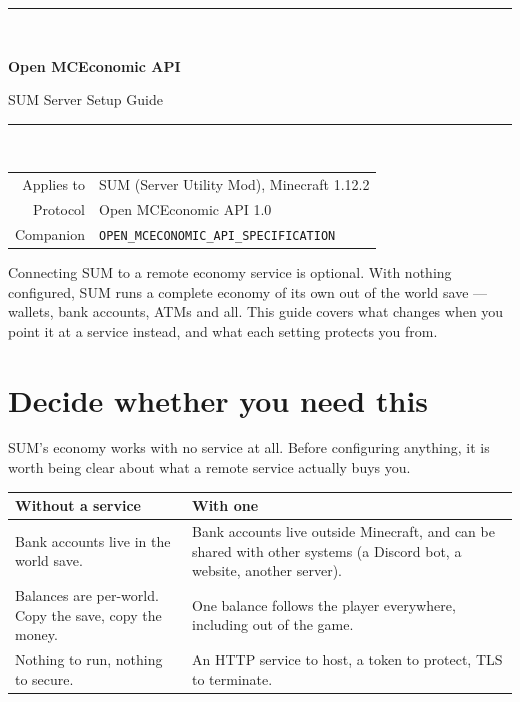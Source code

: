 \documentclass[11pt,a4paper]{article}
\newcommand{\code}[1]{\texttt{\small #1}}
\begin{document}
\begin{titlepage}
\centering
\vspace*{3.2cm}
{\color{omceRule}\rule{\linewidth}{1.2pt}}\\[1.2em]
{\Huge\bfseries\color{omceAccentDark} Open MCEconomic API\par}
\vspace{0.6em}
{\LARGE\color{omceInk} SUM Server Setup Guide\par}
\vspace{0.9em}
{\color{omceRule}\rule{\linewidth}{1.2pt}}\\[2.6em]

\begin{tabular}{r@{\hspace{1.2em}}l}
\color{omceMuted}Applies to   & SUM (Server Utility Mod), Minecraft 1.12.2\\
\color{omceMuted}Protocol     & Open MCEconomic API 1.0\\
\color{omceMuted}Companion    & \code{OPEN\_MCECONOMIC\_API\_SPECIFICATION}\\
\end{tabular}

\vspace{3.2cm}
\begin{minipage}{0.82\linewidth}
\small\color{omceMuted}
Connecting SUM to a remote economy service is optional. With nothing configured, SUM runs a
complete economy of its own out of the world save --- wallets, bank accounts, ATMs and all. This
guide covers what changes when you point it at a service instead, and what each setting protects
you from.
\end{minipage}
\vfill
\end{titlepage}

\tableofcontents
\newpage

\section{Decide whether you need this}

SUM's economy works with no service at all. Before configuring anything, it is worth being clear
about what a remote service actually buys you.

\begin{tabularx}{\linewidth}{L{4.6cm} X}
\toprule
\textbf{Without a service} & \textbf{With one}\\
\midrule
Bank accounts live in the world save. & Bank accounts live outside Minecraft, and can be shared
with other systems (a Discord bot, a website, another server).\\
Balances are per-world. Copy the save, copy the money. & One balance follows the player
everywhere, including out of the game.\\
Nothing to run, nothing to secure. & An HTTP service to host, a token to protect, TLS to
terminate.\\
\bottomrule
\end{tabularx}
\end{document}
